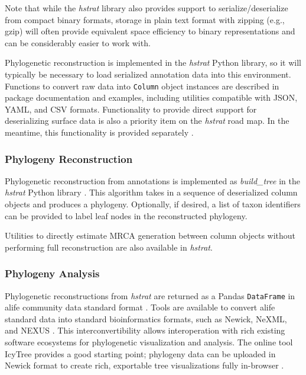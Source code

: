 Note that while the \textit{hstrat} library also provides support to serialize/deserialize from compact binary formats, storage in plain text format with zipping (e.g., gzip) will often provide equivalent space efficiency to binary representations and can be considerably easier to work with.

Phylogenetic reconstruction is implemented in the \textit{hstrat} Python library, so it will typically be necessary to load serialized annotation data into this environment.
Functions to convert raw data into \texttt{Column} object instances are described in package documentation and examples, including utilities compatible with JSON, YAML, and CSV formats.
Functionality to provide direct support for deserializing surface data is also a priority item on the \textit{hstrat} road map.
In the meantime, this functionality is provided separately \citep{moreno2024hsurf}.

\subsubsection{Phylogeny Reconstruction}

Phylogenetic reconstruction from annotations is implemented as \textit{build\_tree} in the \textit{hstrat} Python library \citep{moreno2022hstrat}.
This algorithm takes in a sequence of deserialized column objects and produces a phylogeny.
Optionally, if desired, a list of taxon identifiers can be provided to label leaf nodes in the reconstructed phylogeny.

Utilities to directly estimate MRCA generation between column objects without performing full reconstruction are also available in \textit{hstrat}.

\subsubsection{Phylogeny Analysis}

Phylogenetic reconstructions from \textit{hstrat} are returned as a Pandas \texttt{DataFrame} in alife community data standard format \citep{lalejini2019data,reback2020pandas}.
Tools are available to convert alife standard data into standard bioinformatics formats, such as Newick, NeXML, and NEXUS \citep{moreno2024apc}.
This interconvertibility allows interoperation with rich existing software ecosystems for phylogenetic visualization and analysis.
The online tool IcyTree provides a good starting point; phylogeny data can be uploaded in Newick format to create rich, exportable tree visualizations fully in-browser \citep{vaughan2017icytree}.
